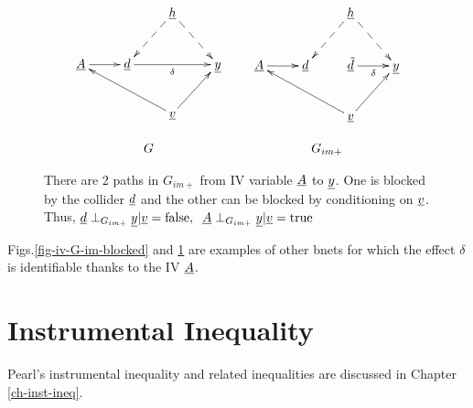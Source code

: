 \begin{figure}[h!]
$$
\begin{array}{ccc}
\xymatrix{
&&\rvh\ar@{-->}[dl]\ar@{-->}[dr]
\\
\rvA\ar[r]
&\rvd\ar[rr]_\delta
&&\rvy
\\
&&\rvv\ar[ur]\ar[ull]
}
&&
\xymatrix{
&&\rvh\ar@{-->}[dl]\ar@{-->}[dr]
\\
\rvA\ar[r]
&\rvd
&
\rvtd\ar[r]_\delta
&\rvy
\\
&&\rvv\ar[ur]\ar[ull]
}
\\
\\
G&&G_{im+}
\end{array}
$$
\caption{
There are 2 paths in $G_{im+}$
from
IV variable ${\underline{A}}$
to ${\underline{y}}$. One is
blocked
by the collider ${\underline{d}}$
and the other
can be blocked by 
conditioning on ${\underline{v}}$. Thus,
$
{\underline{d}}\perp_{G_{im+}} {\underline{y}}|{\underline{v}} =\text{false}, 
\;\; {\underline{A}}\perp_{G_{im+}} {\underline{y}}|{\underline{v}}= \text{true}
$
}
\label{fig-iv-G-im-strata}
\end{figure}

Figs.\ref{fig-iv-G-im-blocked}
and \ref{fig-iv-G-im-strata}
are examples of 
other bnets 
for which the
effect $\delta$
is identifiable
thanks
to the
IV ${\underline{A}}$.


\section{Instrumental Inequality}
Pearl's instrumental inequality
and related inequalities are discussed in
 Chapter
 \ref{ch-inst-ineq}.


